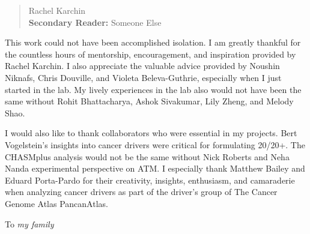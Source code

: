 \begin{frontmatter}
\begin{abstract}
\vfill
{} Rachel Karchin \\
{\bf{Secondary Reader:}} Someone Else
\end{abstract}

\begin{acknowledgment}

This work could not have been accomplished isolation. I am greatly thankful for the countless hours of mentorship, encouragement, and inspiration provided by Rachel Karchin. I also appreciate the valuable advice provided by Noushin Niknafs, Chris Douville, and Violeta Beleva-Guthrie, especially when I just started in the lab. My lively experiences in the lab also would not have been the same without Rohit Bhattacharya, Ashok Sivakumar, Lily Zheng, and Melody Shao.

I would also like to thank collaborators who were essential in my projects. Bert Vogelstein's insights into cancer drivers were critical for formulating 20/20+. The CHASMplus analysis would not be the same without Nick Roberts and Neha Nanda experimental perspective on ATM. I especially thank Matthew Bailey and Eduard Porta-Pardo for their creativity, insights, enthusiasm, and camaraderie when analyzing cancer drivers as part of the driver's group of The Cancer Genome Atlas PancanAtlas.

\end{acknowledgment}

\begin{dedication}
 
To \textit{my family}

\end{dedication}

\tableofcontents

\listoftables

\listoffigures

\end{frontmatter}
